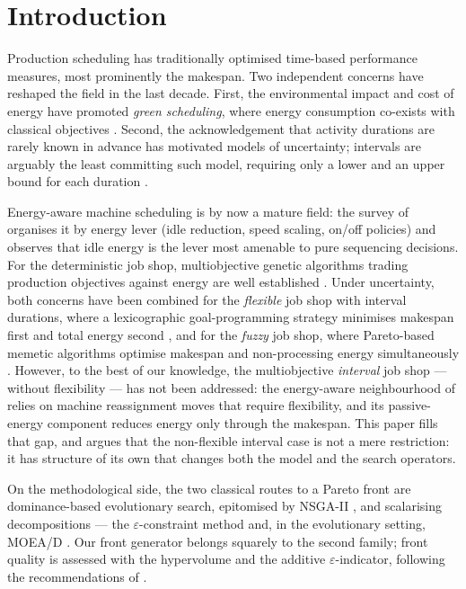 \documentclass[preprint,12pt]{elsarticle}
\begin{document}
\section{Introduction}
\label{sec:intro}

Production scheduling has traditionally optimised time-based performance
measures, most prominently the makespan. Two independent concerns have
reshaped the field in the last decade. First, the environmental impact and
cost of energy have promoted \emph{green scheduling}, where energy
consumption co-exists with classical objectives
\cite{Afsar2022,GonzalezRodriguez2020}. Second, the acknowledgement that
activity durations are rarely known in advance has motivated models of
uncertainty; intervals are arguably the least committing such model,
requiring only a lower and an upper bound for each duration
\cite{Diaz2020,Diaz2023FEABC}.

Energy-aware machine scheduling is by now a mature field: the survey of
\cite{Gahm2016} organises it by energy lever (idle reduction, speed
scaling, on/off policies) and observes that idle energy is the lever most
amenable to pure sequencing decisions. For the deterministic job shop,
multiobjective genetic algorithms trading production objectives against
energy are well established \cite{May2015,ZhangChiong2016}. Under
uncertainty, both concerns have been combined for the \emph{flexible} job
shop with interval durations, where a lexicographic goal-programming
strategy minimises makespan first and total energy second
\cite{Afsar2024,Afsar2025}, and for the \emph{fuzzy} job shop, where
Pareto-based memetic algorithms optimise makespan and non-processing
energy simultaneously \cite{Afsar2022,GonzalezRodriguez2020}. However, to
the best of our knowledge, the multiobjective \emph{interval} job shop ---
without flexibility --- has not been addressed: the energy-aware
neighbourhood of \cite{GarciaGomez2023} relies on machine reassignment
moves that require flexibility, and its passive-energy component reduces
energy only through the makespan. This paper fills that gap, and argues
that the non-flexible interval case is not a mere restriction: it has
structure of its own that changes both the model and the search operators.

On the methodological side, the two classical routes to a Pareto front are
dominance-based evolutionary search, epitomised by NSGA-II \cite{Deb2002},
and scalarising decompositions --- the $\varepsilon$-constraint method
\cite{Haimes1971,Miettinen1999} and, in the evolutionary setting, MOEA/D
\cite{ZhangLi2007}. Our front generator belongs squarely to the second
family; front quality is assessed with the hypervolume and the additive
$\varepsilon$-indicator, following the recommendations of
\cite{Zitzler2003}.
\end{document}
